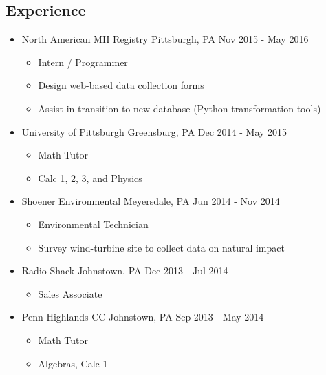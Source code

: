 \documentclass[18pt]{article}
\providecommand{\tightlist}{
    \setlength{\itemsep}{0pt}\setlength{\parskip}{0pt}
}
\begin{document}
    \subsection*{Experience}\label{experience}
      \begin{itemize}\tightlist
        
        \item North American MH Registry \textbar{} Pittsburgh, PA \textbar{} Nov 2015 - May 2016
        \begin{itemize}\tightlist
          \item Intern / Programmer
          \item Design web-based data collection forms
          \item Assist in transition to new database (Python transformation tools)
        \end{itemize}

        \item University of Pittsburgh \textbar{} Greensburg, PA \textbar{} Dec 2014 - May 2015
        \begin{itemize}\tightlist
          \item Math Tutor
          \item Calc 1, 2, 3, and Physics
        \end{itemize}
        
        \item Shoener Environmental \textbar{} Meyersdale, PA \textbar{} Jun 2014 - Nov 2014
        \begin{itemize}\tightlist
          \item Environmental Technician
          \item Survey wind-turbine site to collect data on natural impact
        \end{itemize}
        
        \item Radio Shack \textbar{} Johnstown, PA \textbar{} Dec 2013 - Jul 2014
        \begin{itemize}\tightlist
          \item Sales Associate
        \end{itemize}

        \item Penn Highlands CC \textbar{} Johnstown, PA \textbar{} Sep 2013 - May 2014
        \begin{itemize}\tightlist
          \item Math Tutor
          \item Algebras, Calc 1
        \end{itemize}

      \end{itemize} %
\end{document}
